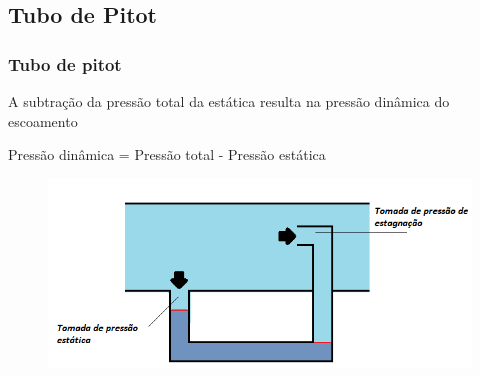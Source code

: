 \subsection{Tubo de Pitot}

\begin{frame}
\frametitle{Tubo de pitot}

A subtração da pressão total da estática resulta na pressão dinâmica do escoamento

Pressão dinâmica = Pressão total - Pressão estática

\begin{figure}
\centering
\includegraphics[scale = 0.5]{figuras/pestagnacao}
\end{figure}

\end{frame}